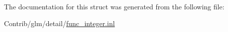 The documentation for this struct was generated from the following file\+:\begin{DoxyCompactItemize}
\item 
Contrib/glm/detail/\mbox{\hyperlink{func__integer_8inl}{func\+\_\+integer.\+inl}}\end{DoxyCompactItemize}
